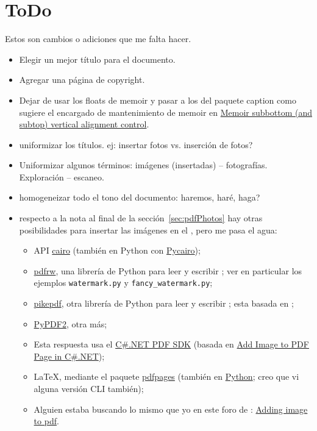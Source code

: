 \documentclass[%
	a5paper,
	10pt,
	twoside,
	openright,
	final,
]{memoir}
\begin{document}
\chapter{ToDo} Estos son cambios o adiciones que me falta hacer.
\begin{itemize}
	\item Elegir un mejor título para el documento.
	\item Agregar una página de copyright.
	\item Dejar de usar los floats de memoir y pasar a los del paquete caption como sugiere el encargado de mantenimiento de memoir en \href{https://tex.stackexchange.com/questions/524747/memoir-subbottom-and-subtop-vertical-alignment-control}{Memoir subbottom (and subtop) vertical alignment control}.
	\item uniformizar los títulos. ej: insertar fotos vs. inserción de fotos?
	\item Uniformizar algunos términos: imágenes (insertadas) -- fotografías. Exploración -- escaneo.
	\item homogeneizar todo el tono del documento: haremos, haré, haga?
	\item respecto a la nota al final de la sección~\ref{sec:pdfPhotos} hay otras posibilidades para insertar las imágenes en el \pdf, pero me pasa el agua:
		\begin{itemize}[noitemsep]
			\item API \href{cairographics.org}{cairo} (también en Python con \href{https://www.cairographics.org/pycairo/}{Pycairo});
			\item \href{https://github.com/pmaupin/pdfrw}{pdfrw}, una librería de Python para leer y escribir \pdf; ver en particular los ejemplos \texttt{watermark.py} y \texttt{fancy\_watermark.py};
			\item \href{https://github.com/pikepdf/pikepdf}{pikepdf}, otra librería de Python para leer y escribir \pdf; esta basada en \qpdf;
			\item \href{https://github.com/mstamy2/PyPDF2}{PyPDF2}, otra más;
			\item Esta respuesta usa el \href{https://askubuntu.com/a/334463}{C\#.NET PDF SDK} (basada en \href{http://www.rasteredge.com/how-to/csharp-imaging/pdf-add-image/}{Add Image to PDF Page in C\#.NET});
			\item \LaTeX, mediante el paquete \href{https://www.ctan.org/pkg/pdfpages}{pdfpages} (también en \href{https://pypi.org/project/pdfpages/}{Python}; creo que vi alguna versión CLI también);
			\item Alguien estaba buscando lo mismo que yo en este foro de \imagemagick: \href{https://www.imagemagick.org/discourse-server/viewtopic.php?t=31103}{Adding image to pdf}.

\end{itemize}
\end{itemize}
\end{document}
